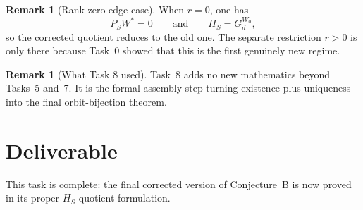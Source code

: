 \documentclass{article}
\theoremstyle{definition}
\newtheorem{remark}[theorem]{Remark}
\begin{document}
\begin{remark}[Rank-zero edge case]
When $r=0$, one has
\[
P_SW^\ast=0
\qquad\text{and}\qquad
H_S=G_d^{W_0},
\]
so the corrected quotient reduces to the old one. The separate restriction
$r>0$ is only there because Task~0 showed that this is the first genuinely new
regime.
\end{remark}

\begin{remark}[What Task 8 used]
Task~8 adds no new mathematics beyond Tasks~5 and~7. It is the formal assembly
step turning existence plus uniqueness into the final orbit-bijection theorem.
\end{remark}

\section{Deliverable}

This task is complete: the final corrected version of Conjecture~B is now
proved in its proper $H_S$-quotient formulation.
\end{document}

